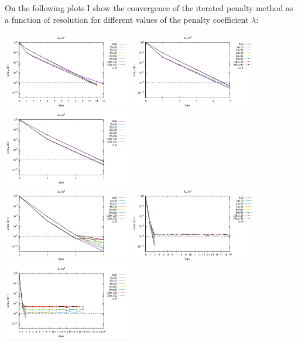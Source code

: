 On the following plots I show the convergence of the iterated penalty method as 
a function of resolution for different values of the penalty coefficient $\lambda$:

\begin{center}
\includegraphics[width=5.6cm]{python_codes/fieldstone_161/results/bench2/conv1.pdf}
\includegraphics[width=5.6cm]{python_codes/fieldstone_161/results/bench2/conv2.pdf}
\includegraphics[width=5.6cm]{python_codes/fieldstone_161/results/bench2/conv3.pdf}\\
\includegraphics[width=5.6cm]{python_codes/fieldstone_161/results/bench2/conv4.pdf}
\includegraphics[width=5.6cm]{python_codes/fieldstone_161/results/bench2/conv5.pdf}
\includegraphics[width=5.6cm]{python_codes/fieldstone_161/results/bench2/conv6.pdf}
\end{center}

